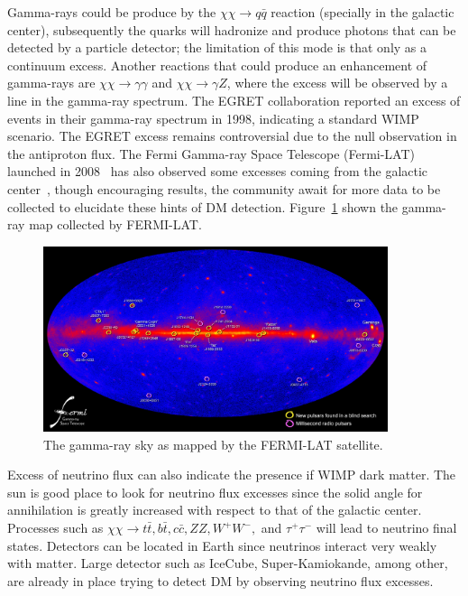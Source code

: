 Gamma-rays could be produce by the $\chi\chi\rightarrow q\bar{q}$
reaction (specially in the galactic center), subsequently the quarks will hadronize and produce photons
that can be detected by a particle detector; the limitation of this
mode is that only as a continuum excess. Another reactions that could
produce an enhancement of gamma-rays are $\chi\chi\rightarrow
\gamma\gamma$ and $\chi\chi\rightarrow
\gamma Z$, where the excess will be observed by a line in the
gamma-ray spectrum. The EGRET collaboration reported an excess of
events in their gamma-ray spectrum in 1998\cite{EGRETT}, indicating a
standard WIMP scenario. The EGRET excess remains controversial due to
the null observation in the antiproton flux. The Fermi Gamma-ray Space
Telescope (Fermi-LAT) launched in 2008~\cite{FERMILAT} has also observed some
excesses coming from the galactic center~\cite{FermiExcess}, though encouraging results,
the community await for more data to be collected to elucidate these
hints of DM detection. Figure~\ref{fig:FERMI} shown the gamma-ray map
collected by FERMI-LAT.

\begin{figure}
 \centering
\includegraphics[width=0.9\textwidth]{IntroFigures/Fermi_Map.jpg}
\caption{The gamma-ray sky as mapped by the FERMI-LAT satellite.\label{fig:FERMI}}
\end{figure}

Excess of neutrino flux can also indicate the presence if WIMP dark
matter. The sun is  good place to look for neutrino flux excesses
since the solid angle for annihilation is greatly increased with
respect to that of the galactic center. Processes such as
$\chi\chi\rightarrow t\bar{t}, b\bar{t}, c\bar{c}, ZZ, W^{+}W^{-},$ and
$\tau^{+}\tau^{-}$ will lead to neutrino final states. Detectors can
be located in Earth since  neutrinos interact very weakly with
matter. Large detector such as IceCube, Super-Kamiokande, among other, are already in place trying to detect DM by
observing neutrino flux excesses.

